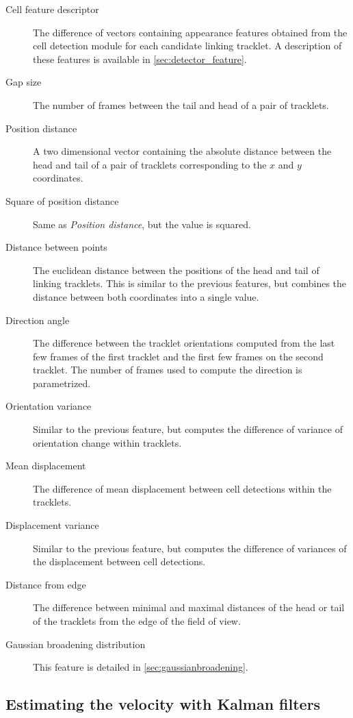  		\begin{description}
    		\item[Cell feature descriptor] The difference of vectors containing appearance features obtained from the cell detection module for each candidate linking tracklet. A description of these features is available in \cref{sec:detector_feature}.
    		\item[Gap size] The number of frames between the tail and head of a pair of tracklets.
    		\item[Position distance] A two dimensional vector containing the absolute distance between the head and tail of a pair of tracklets corresponding to the $x$ and $y$ coordinates.
    		\item[Square of position distance] Same as \textit{Position distance}, but the value is squared.
    		\item[Distance between points] The euclidean distance between the positions of the head and tail of linking tracklets. This is similar to the previous features, but combines the distance between both coordinates into a single value.
    		\item[Direction angle] The difference between the tracklet orientations computed from the last few frames of the first tracklet and the first few frames on the second tracklet. The number of frames used to compute the direction is parametrized.
    		\item[Orientation variance] Similar to the previous feature, but computes the difference of variance of orientation change within tracklets.
    		\item[Mean displacement] The difference of mean displacement between cell detections within the tracklets.
    		\item[Displacement variance] Similar to the previous feature, but computes the difference of variances of the displacement between cell detections.
    		\item[Distance from edge] The difference between minimal and maximal distances of the head or tail of the tracklets from the edge of the field of view.
    		\item[Gaussian broadening distribution] This feature is detailed in \cref{sec:gaussianbroadening}.
    	\end{description}
    	
    	\subsection{Estimating the velocity with Kalman filters \statusnew}
    		\notyetimplemented{}
